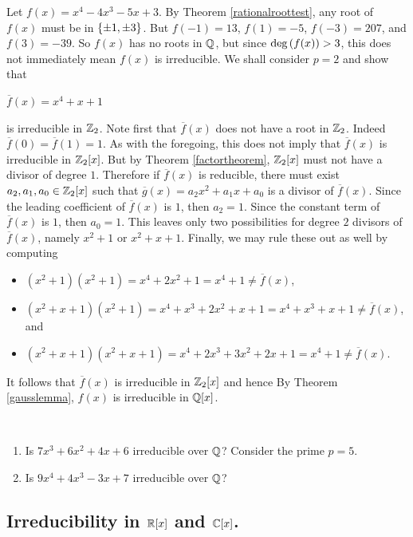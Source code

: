 \documentclass[11pt,fleqn,dvipsnames,usenames]{article}
\begin{document}
\begin{example}
Let $f(x) = x^4 - 4x^3 - 5x + 3$.  By Theorem \ref{rationalroottest}, any root of $f(x)$ must be in $\left\{\pm 1,\pm 3\right\}$.  But $f(-1) = 13$, $f(1) = -5$, $f(-3) = 207$, and $f(3) = -39$.  So $f(x)$ has no roots in $\mathbb{Q}$, but since $\text{deg}\left(f(x)\right) > 3$, this does not immediately mean $f(x)$ is irreducible.  We shall consider $p = 2$ and show that
\begin{center}
$\overline{f}(x) = x^4 + x + 1$
\end{center}
is irreducible in $\mathbb{Z}_2$.  Note first that $\overline{f}(x)$ does not have a root in $\mathbb{Z}_2$.  Indeed $\overline{f}(0) = \overline{f}(1) = 1$.  As with the foregoing, this does not imply that $\overline{f}(x)$ is irreducible in $\mathbb{Z}_{2}[x]$.  But by Theorem \ref{factortheorem}, $\mathbb{Z}_{2}[x]$ must not have a divisor of degree $1$.  Therefore if $\overline{f}(x)$ is reducible, there must exist $a_{2},a_{1},a_{0}\in\mathbb{Z}_{2}[x]$ such that $\overline{g}(x) = a_{2}x^2 + a_{1}x + a_{0}$ is a divisor of $\overline{f}(x)$.  Since the leading coefficient of $\overline{f}(x)$ is $1$, then $a_{2} = 1$.  Since the constant term of $\overline{f}(x)$ is $1$, then $a_{0} = 1$.  This leaves only two possibilities for degree $2$ divisors of $\overline{f}(x)$, namely $x^2 + 1$ or $x^2 + x + 1$.  Finally, we may rule these out as well by computing
\begin{itemize}[\ ]
\item $(x^2 + 1)(x^2 + 1) = x^4 + 2x^2 + 1 = x^4 + 1 \neq \overline{f}(x)$,
\item $(x^2 + x + 1)(x^2 +1) = x^4 + x^3 + 2x^2 + x  + 1 = x^4 + x^3 + x + 1 \neq \overline{f}(x)$, and
\item $(x^2 + x + 1)(x^2 + x + 1) = x^4 + 2x^3 + 3x^2 + 2x + 1 = x^4 + 1\neq \overline{f}(x)$.
\end{itemize}
It follows that $\overline{f}(x)$ is irreducible in $\mathbb{Z}_2[x]$ and hence By Theorem \ref{gausslemma}, $f(x)$ is irreducible in $\mathbb{Q}[x]$.
\end{example}
%
\begin{exercises}~
\begin{enumerate}[1.]
\item Is $7x^3 + 6x^2 + 4x + 6$ irreducible over $\mathbb{Q}$?  \hint Consider the prime $p=5$.
\item Is $9x^4 + 4x^3 - 3x + 7$ irreducible over $\mathbb{Q}$?
\end{enumerate}
\end{exercises}
%
\subsection{Irreducibility in \texorpdfstring{$\mathbb{R}[x]$ and $\mathbb{C}[x]$}{R[x] and C[x]}.}
\end{document}

